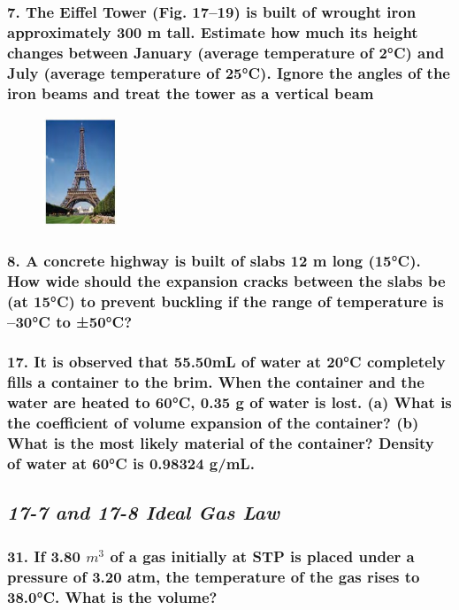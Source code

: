 \documentclass{article}
\begin{document}
\subsubsection*{
    7. The Eiffel Tower (Fig. 17–19) is built of wrought iron approximately 300 m
       tall. Estimate how much its height changes between January (average 
       temperature of 2°C) and July (average temperature of 25°C). Ignore the
       angles of the iron beams and treat the tower as a vertical beam
}
\begin{figure}[h]
    \begin{center}
        \includegraphics[width=0.2\textwidth]{figures/p7.jpg}
    \end{center}
\end{figure}
\subsubsection*{
    8. A concrete highway is built of slabs 12 m long (15°C). How wide should
    the expansion cracks between the slabs be (at 15°C) to prevent buckling if
    the range of temperature is –30°C to ±50°C?
}
\subsubsection*{
    17. It is observed that 55.50mL of water at 20°C completely fills a container
    to the brim. When the container and the water are heated to 60°C, 0.35 g of
    water is lost. (a) What is the coefficient of volume expansion of the container?
    (b) What is the most likely material of the container? Density of water at 60°C
    is 0.98324 g/mL.
}
\newpage
\begin{center}
    \subsection*{\textbf{\textit{17-7 and 17-8 Ideal Gas Law}}}
\end{center}
\subsubsection*{
    31. If 3.80 $m^3$ of a gas initially at STP is placed under a pressure of 3.20 atm,
    the temperature of the gas rises to 38.0°C. What is the volume?
}
\end{document}
